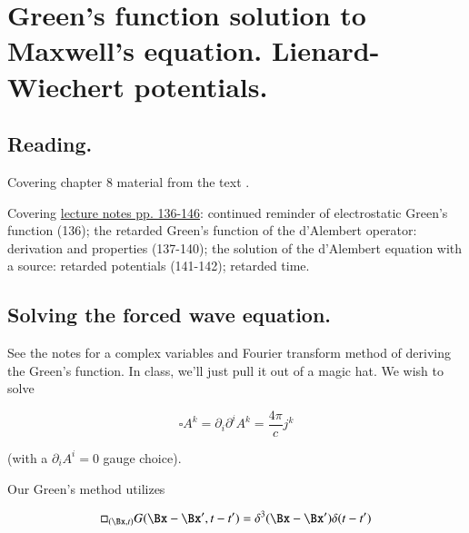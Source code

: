 %
%

\chapter{Green's function solution to Maxwell's equation.  Lienard-Wiechert potentials.}
\label{chap:relativisticElectrodynamicsL18}
{}
\date{Mar 9, 2011}

\beginArtNoToc

\section{Reading.}

Covering chapter 8 material from the text \citep{landau1980classical}.

Covering \href{http://www.physics.utoronto.ca/~poppitz/epoppitz/PHY450_files/RelEMpp136-146.pdf}{lecture notes pp. 136-146}: continued reminder of electrostatic Green's function (136); the retarded Green's function of the d'Alembert operator: derivation and properties (137-140); the solution of the d'Alembert equation with a source: retarded potentials (141-142); retarded time.

\section{Solving the forced wave equation.}

See the notes for a complex variables and Fourier transform method of deriving the Green's function.  In class, we'll just pull it out of a magic hat.  We wish to solve

\begin{equation}\label{eqn:relativisticElectrodynamicsL18:10}
\square A^k = \partial_i \partial^i A^k = \frac{4 \pi}{c} j^k
\end{equation}

(with a $\partial_i A^i = 0$ gauge choice).

Our Green's method utilizes

\begin{equation}\label{eqn:relativisticElectrodynamicsL18:30}
\square_{(\Bx, t)} G(\Bx - \Bx', t - t') = \delta^3( \Bx - \Bx') \delta( t - t')
\end{equation}

